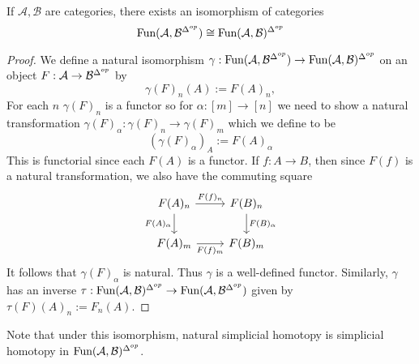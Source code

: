 \begin{lem}[label=lem:isoOfSimpFuncs]
    If $\mathcal{A},\mathcal{B}$ are categories, there exists an isomorphism of categories
    \begin{equation*}
        \text{Fun}(\mathcal{A},\mathcal{B}^{\Delta^{op}}) \cong \text{Fun}(\mathcal{A},\mathcal{B})^{\Delta^{op}}
    \end{equation*}
\end{lem}
\begin{proof}
    We define a natural isomorphism $\gamma:\text{Fun}(\mathcal{A},\mathcal{B}^{\Delta^{op}}) \to \text{Fun}(\mathcal{A},\mathcal{B})^{\Delta^{op}}$ on an object $F:\mathcal{A}\to \mathcal{B}^{\Delta^{op}}$ by 
    \begin{equation*}
        \gamma(F)_n(A) := F(A)_n,
    \end{equation*}
    For each $n$ $\gamma(F)_n$ is a functor so for $\alpha:[m]\to [n]$ we need to show a natural transformation $\gamma(F)_\alpha:\gamma(F)_n\to \gamma(F)_m$ which we define to be
    \begin{equation*}
        (\gamma(F)_\alpha)_A := F(A)_\alpha 
    \end{equation*}
    This is functorial since each $F(A)$ is a functor. If $f:A\to B$, then since $F(f)$ is a natural transformation, we also have the commuting square
    \[\begin{tikzcd}
        {F(A)_n} & {F(B)_n} \\
        {F(A)_m} & {F(B)_m}
        \arrow["{F(A)_\alpha}"', from=1-1, to=2-1]
        \arrow["{F(f)_n}", from=1-1, to=1-2]
        \arrow["{F(f)_m}"', from=2-1, to=2-2]
        \arrow["{F(B)_\alpha}", from=1-2, to=2-2]
    \end{tikzcd}\]
    It follows that $\gamma(F)_\alpha$ is natural. Thus $\gamma$ is a well-defined functor. Similarly, $\gamma$ has an inverse $\tau:\text{Fun}(\mathcal{A},\mathcal{B})^{\Delta^{op}}\to \text{Fun}(\mathcal{A},\mathcal{B}^{\Delta^{op}})$ given by $\tau(F)(A)_n := F_n(A)$.
\end{proof}

Note that under this isomorphism, natural simplicial homotopy is simplicial homotopy in $\text{Fun}(\mathcal{A},\mathcal{B})^{\Delta^{op}}$. 


